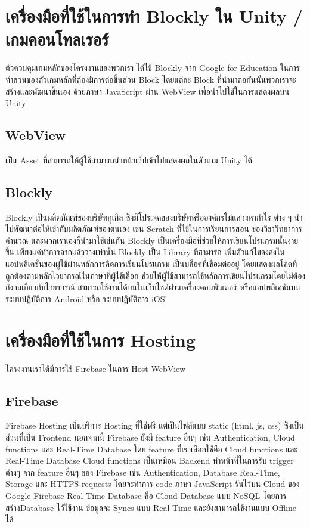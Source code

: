 \section{เครื่องมือที่ใช้ในการทำ Blockly ใน Unity / เกมคอนโทลเรอร์}
ตัวควบคุมเกมหลักของโครงงานของพวกเรา ได้ใช้ Blockly 
จาก Google for Education ในการทำส่วนของตัวเกมหลักที่ต้องมีการต่อชิ้นส่วน 
Block โดยแต่ละ Block ที่นำมาต่อกันนั้นพวกเราจะสร้างและพัฒนาขึ้นเอง ด้วยภาษา 
JavaScript ผ่าน WebView เพื่อนำไปใช้ในการแสดงผลบน Unity
\subsection{WebView}
เป็น Asset ที่สามารถให้ผู้ใช้สามารถนำหน้าเว็ปเข้าไปแสดงผลในตัวเกม Unity ได้~\cite{unw}
\subsection{Blockly}
Blockly เป็นผลิตภัณฑ์ของบริษัทกูเกิล ซึ่งมีโปรเจคของบริษัทหรือองค์กรไม่แสวงหากำไร 
ต่าง ๆ นำไปพัฒนาต่อให้เข้ากับผลิตภัณฑ์ของตนเอง เช่น Scratch ที่ใช้ในการเรียนการสอน
ของวิชาวิทยาการคำนวณ
และพวกเราเองก็นำมาใช้เช่นกัน Blockly 
เป็นเครื่องมือที่ช่วยให้การเขียนโปรแกรมนั้นง่ายขึ้น 
เพียงแค่ทำการลากแล้ววางเท่านั้น   Blockly เป็น Library ที่สามารถ
เพิ่มตัวแก้ไขลงลงในแอปพลิเคชันของผู้ใช้ผ่านหลักการคิดการเขียนโปรแกรม
เป็นบล็อคที่เชื่อมต่ออยู่ โดยแสดงผลโค้ดที่ถูกต้องตามหลักไวยากรณ์ในภาษาที่ผู้ใช้เลือก 
ช่วยให้ผู้ใช้สามารถใช้หลักการเขียนโปรแกรมโดยไม่ต้องกังวลเกี่ยวกับไวยากรณ์ 
สามารถใช้งานได้บนในเว็บไซต์ผ่านเครื่องคอมพิวเตอร์ หรือแอปพลิเคชันบน 
ระบบปฏิบัติการ Android หรือ ระบบปฏิบัติการ iOS!\cite{blc}

\section{เครื่องมือที่ใช้ในการ Hosting}
โครงงานเราได้มีการใช้ Firebase ในการ Host WebView
\subsection{Firebase}
Firebase Hosting เป็นบริการ Hosting ที่ใช้ฟรี 
แต่เป็นไฟล์แบบ static (html, js, css) 
ซึ่งเป็นส่วนที่เป็น Frontend นอกจากนี้ Firebase 
ยังมี feature อื่นๆ เช่น Authentication, Cloud functions 
และ Real-Time Database โดย feature ที่เราเลือกใช้คือ 
Cloud functions และ Real-Time Database\newline
Cloud functions เป็นเหมือน Backend ทำหน้าที่ในการรับ 
trigger ต่างๆ จาก feature อื่นๆ ของ Firebase 
เช่น Authentication, Database Real-Time, Storage 
และ HTTPS requests โดยจะทำการ code ภาษา JavaScript 
รันไว้บน Cloud ของ Google\newline
Firebase Real-Time Database คือ Cloud Database 
แบบ NoSQL โดยการสร้างDatabase ไว้ใช้งาน ข้อมูลจะ Syncs 
แบบ Real-Time และยังสามารถใช้งานแบบ Offline ได้\newline

